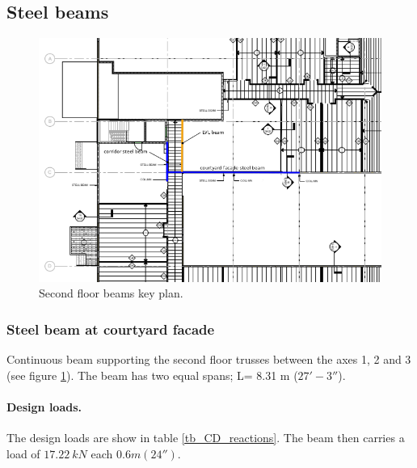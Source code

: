 \subsection{Steel beams}

\begin{figure}
  \begin{center}
  \includegraphics[width=120mm]{figures/steel_beams_key_plan}
  \end{center}
  \caption{Second floor beams key plan.}\label{fg_2nd_floor_beams_key_plan}
\end{figure}

\subsubsection{Steel beam at courtyard facade}
Continuous beam supporting the second floor trusses between the axes 1, 2 and 3 (see figure \ref{fg_2nd_floor_beams_key_plan}). The beam has two equal spans; L= 8.31 m ($27' - 3''$).

\paragraph{Design loads.}
The design loads are show in table \ref{tb_CD_reactions}. The beam then carries a load of $17.22\ kN$ each $0.6 m (24'')$. 


